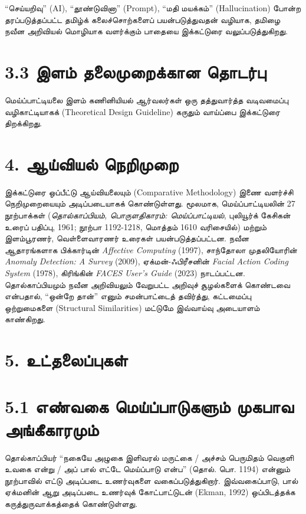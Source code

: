 \documentclass[journal,10pt,twocolumn]{IEEEtran}
\begin{document}
“செய்யறிவு” (AI), “தூண்டுவினா”
(Prompt), “மதி மயக்கம்” (Hallucination) போன்ற தரப்படுத்தப்பட்ட தமிழ்க்
கலைச்சொற்களைப் பயன்படுத்துவதன் வழியாக, தமிழை நவீன அறிவியல் மொழியாக வளர்க்கும்
பாதையை இக்கட்டுரை வலுப்படுத்துகிறது.

\section{3.3 இளம் தலைமுறைக்கான
தொடர்பு}\label{uxb87uxbb3uxbae-uxba4uxbb2uxbaeuxbb1uxb95uxb95uxba9-uxba4uxb9fuxbb0uxbaa}

மெய்ப்பாட்டியலை இளம் கணினியியல் ஆர்வலர்கள் ஒரு தத்துவார்த்த வடிவமைப்பு வழிகாட்டியாகக்
(Theoretical Design Guideline) கருதும் வாய்ப்பை இக்கட்டுரை திறக்கிறது.

\section{4. ஆய்வியல்
நெறிமுறை}\label{uxb86uxbafuxbb5uxbafuxbb2-uxba8uxbb1uxbaeuxbb1}

இக்கட்டுரை ஒப்பீட்டு ஆய்வியலையும் (Comparative Methodology) இணை வளர்ச்சி
நெறிமுறையையும் அடிப்படையாகக் கொண்டுள்ளது. மூலமாக, மெய்ப்பாட்டியலின் 27 நூற்பாக்கள்
(\emph{தொல்காப்பியம், பொருளதிகாரம்: மெய்ப்பாட்டியல்}, புலியூர்க் கேசிகன் உரைப்
பதிப்பு, 1961; நூற்பா 1192-1218, மொத்தம் 1610 வரிசையில்) மற்றும் இளம்பூரணர்,
வெள்ளைவாரணர் உரைகள் பயன்படுத்தப்பட்டன. நவீன ஆதாரங்களாக பிக்கார்டின் \emph{Affective
Computing} (1997), சாந்தோலா முதலியோரின் \emph{Anomaly Detection: A Survey}
(2009), ஏக்மன்-ஃபிரீசனின் \emph{Facial Action Coding System} (1978),
கிரிங்கின் \emph{FACES User's Guide} (2023) நாடப்பட்டன. தொல்காப்பியமும் நவீன
அறிவியலும் வேறுபட்ட அறிவுச் சூழல்களைக் கொண்டவை என்பதால், “ஒன்றே தான்” எனும்
சமன்பாட்டைத் தவிர்த்து, கட்டமைப்பு ஒற்றுமைகளை (Structural Similarities) மட்டுமே
இவ்வாய்வு அடையாளம் காண்கிறது.

\section{5. உட்தலைப்புகள்}\label{uxb89uxb9fuxba4uxbb2uxbaauxbaauxb95uxbb3}

\section{5.1 எண்வகை மெய்ப்பாடுகளும் முகபாவ
அங்கீகாரமும்}\label{uxb8euxba3uxbb5uxb95-uxbaeuxbafuxbaauxbaauxb9fuxb95uxbb3uxbae-uxbaeuxb95uxbaauxbb5-uxb85uxb99uxb95uxb95uxbb0uxbaeuxbae}

தொல்காப்பியர் “நகையே அழுகை இளிவரல் மருட்கை / அச்சம் பெருமிதம் வெகுளி உவகை என்று
/ அப் பால் எட்டே மெய்ப்பாடு என்ப” (தொல். பொ. 1194) என்னும் நூற்பாவில் எட்டு
அடிப்படை உணர்வுகளை வகைப்படுத்துகிறார். இவ்வகைப்பாடு, பால் ஏக்மனின் ஆறு அடிப்படை
உணர்வுக் கோட்பாட்டுடன் (Ekman, 1992) ஒப்பிடத்தக்க கருத்துருவாக்கத்தைக் கொண்டுள்ளது.
\end{document}
